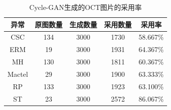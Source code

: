 \documentclass{article}
\begin{document}
		{
			\fontsize{9}{12}\selectfont
			{
				\begin{longtable}{ccccc}
					\caption{Cycle-GAN生成的OCT图片的采用率}
					\label{tb:cycleGAN_number}\\
					\toprule
					异常&原图数量&生成数量&采用数量&采用率\\
					\midrule
					CSC   &134&3000&1730&58.667\% \\
					ERM   &19 &3000&1931&64.367\% \\
					MH    &130&3000&1811&60.367\% \\
					Mactel&29 &3000&1900&63.333\% \\
					RP    &133&3000&1923&63.100\% \\
					ST    &23 &3000&2572&86.067\% \\
					\bottomrule
				\end{longtable}
			}
		}
	
\end{document}
